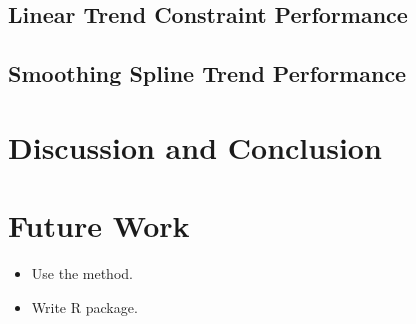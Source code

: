 \documentclass[12pt]{article}
\providecommand{\tightlist}{%
  \setlength{\itemsep}{0pt}\setlength{\parskip}{0pt}}
\begin{document}
\hypertarget{linear-trend-constraint-performance}{%
\subsection{Linear Trend Constraint
Performance}\label{linear-trend-constraint-performance}}

\hypertarget{smoothing-spline-trend-performance}{%
\subsection{Smoothing Spline Trend
Performance}\label{smoothing-spline-trend-performance}}

\hypertarget{discussion-and-conclusion}{%
\section{Discussion and Conclusion}\label{discussion-and-conclusion}}

\hypertarget{future-work}{%
\section{Future Work}\label{future-work}}

\begin{itemize}
\tightlist
\item
  Use the method.
\item
  Write R package.
\end{itemize}



\end{document}
